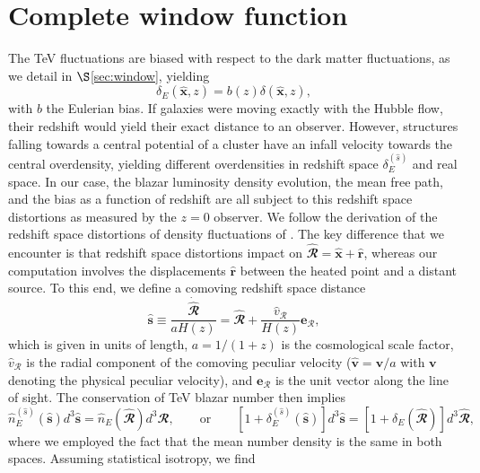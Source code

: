 \documentclass[numberedappendix]{emulateapj}
\newcommand{\calR}{\ensuremath{\bm\hat{\mathbfcal{R}}}}
\begin{document}
\section{Complete window function}
\label{sec:window_complete}
The TeV fluctuations are biased with respect to the dark matter fluctuations, as we detail in $\S$\ref{sec:window}, yielding
\begin{equation}
\delta_E(\mathbf{\hat{x}},z)=b(z)\delta(\mathbf{\hat{x}},z),
\label{eq:bias}
\end{equation}
with $b$ the Eulerian bias. If galaxies were moving exactly with the Hubble flow, their redshift would yield their exact distance to an observer. However, structures falling towards a central potential of a cluster have an infall velocity  towards the central overdensity, yielding different overdensities in redshift space $\delta_E^{(\hat{s})}$ and real space. In our case, the blazar luminosity density evolution, the mean free path, and the bias as a function of redshift are all subject to this redshift space distortions as measured by the $z=0$ observer. We follow the derivation of the redshift space distortions of density fluctuations of \citet{MFW}. The key difference that we encounter is that redshift space distortions impact on $\calR=\bm\hat{\mathbf{x}}+\bm\hat{\mathbf{r}}$, whereas our computation involves the displacements $\bm\hat{\mathbf{r}}$ between the heated point and a distant source. To this end, we define a comoving redshift space distance
\begin{equation}
\mathbf{\hat{s}} \equiv\frac{\dot{\calR}}{a H(z)} = 
\calR + \frac{\hat{v}_{\mathcal{R}}}{H(z)} \mathbf{e}_\mathcal{R},
\label{eq:s_redshift}
\end{equation}
which is given in units of length, $a=1/(1+z)$ is the cosmological scale factor, $\hat{v}_\mathcal{R}$ is the radial component of the comoving peculiar velocity ($\mathbf{\hat{v}} = \mathbf{v}/a$ with $\mathbf{v}$ denoting the physical peculiar velocity), and $\mathbf{e}_\mathcal{R}$ is the unit vector along the line of sight. The conservation of TeV blazar number then implies
\begin{equation}
\hat n_E^{(\hat s)}(\mathbf{\hat s}) d^3\mathbf{\hat s} = \hat n_E(\calR) d^3\calR,
\qquad\mbox{or}\qquad
\left[1+\delta_E^{(\hat s)}(\mathbf{\hat s})\right] d^3\mathbf{\hat s} = 
\left[1+\delta_E(\calR)\right] d^3\calR,
\label{eq:conservation}
\end{equation}
where we employed the fact that the mean number density is the same in both spaces. Assuming statistical isotropy, we find
\end{document}
